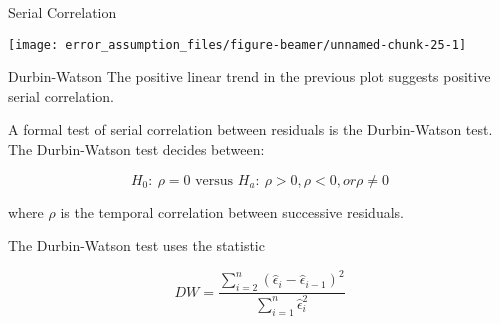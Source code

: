 \begin{frame}[fragile]{Serial Correlation}
\protect\hypertarget{serial-correlation}{}
\begin{Shaded}
\begin{Highlighting}[]
\StringTok{ }
\NormalTok{(}\NormalTok{(}\OperatorTok{{-}}\StringTok{ }\NormalTok{) }\OperatorTok{\textasciitilde{}}\StringTok{ }
\StringTok{     }\NormalTok{(}\OperatorTok{{-}}\StringTok{ }\NormalTok{), }
      \NormalTok{(}
     \NormalTok{(}\NormalTok{(epsilon)[i}\OperatorTok{+}\NormalTok{]))}
\NormalTok{(} \NormalTok{ , } \NormalTok{, } \NormalTok{(}\NormalTok{))}
\end{Highlighting}
\end{Shaded}

\begin{center}\texttt{[image: error\_assumption\_files/figure-beamer/unnamed-chunk-25-1]} \end{center}
\end{frame}

\begin{frame}{Durbin-Watson}
\protect\hypertarget{durbin-watson}{}
The positive linear trend in the previous plot suggests positive serial
correlation.

A formal test of serial correlation between residuals is the
Durbin-Watson test. The Durbin-Watson test decides between:

\[H_0:\ \rho=0 \text{ versus } H_a:\ \rho>0,\rho<0,or \rho\neq 0\]

where \(\rho\) is the temporal correlation between successive residuals.

The Durbin-Watson test uses the statistic

\[DW = \frac{\sum_{i=2}^n \left(\hat{\epsilon}_i - \hat{\epsilon}_{i-1}\right)^2}{\sum_{i=1}^n \hat{\epsilon}_i^2}\]
\end{frame}

